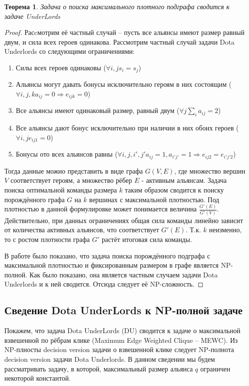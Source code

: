 \documentclass{article}
\newtheorem{theorem}{Теорема}
\begin{document}
\begin{theorem}
\label{MEWC_DU}
Задача о поиска максимального плотного подграфа сводится к задаче UnderLords
\end{theorem}
\begin{proof}
Расcмотрим её частный случай -- пусть все альянсы имеют размер равный двум, и сила всех героев одинакова. Рассмотрим частный случай задачи Dota Underlords со следующими ограничениями:

\begin{enumerate}
    \item Силы всех героев одинаковы ($\forall i, j s_i=s_j$)
    \item Альянсы могут давать бонусы исключительно героям в них состоящим ($\forall i, j, k a_{ij}=0 \Longrightarrow e_{ijk} = 0$)
    \item Все альянсы имеют одинаковый размер, равный двум ($\forall j \sum_i a_{ij}=2$)
    \item Все альянсы дают бонус исключительно при наличии в них обоих героев ($\forall i, j e_{ij1}=0$)
    \item Бонусы ото всех альянсов равны ($\forall i, j, i', j' a_{ij}=1, a_{i' j'}=1 \Longrightarrow e_{ij2}=e_{i' j' 2}$)
\end{enumerate}

Тогда данные можно представить в виде графа $G(V, E)$, где множество вершин $V$ соответствует героям, а множество рёбер $E$ - активным альянсам. Задача поиска оптимальной команды размера $k$ таким образом сводится к поиску порождённого графа $G$ на $k$ вершинах с максимальной плотностью. Под плотностью в данной формулировке может понимается величина $\frac{G'(E)}{G'(V)}$. Действительно, при данных ограничениях общая сила команды линейно зависит от количества активных альянсов, что соответствует $G'(E)$. Т.к. $k$ неизменно, то с ростом плотности графа $G'$ растёт итоговая сила команды.

В работе \cite{downey1995fixed} было показано, что задача поиска порождённого подграфа с максимальной плотностью и фиксированным размером в графе является NP-полной. Как было показано, она является частным случаем задачи Dota Underlords и к ней сводится. Отсюда следует её NP-сложность.

\end{proof}

\subsection{Сведение Dota UnderLords к NP-полной задаче}
Покажем, что задача Dota UnderLords (DU) сводится к задаче о максимальной взвешенной по рёбрам клике (Maximum Edge Weighted Clique – MEWC).
Из NP-плносты decision version задачи о взвешенной клике следует NP-полнота decision version задачи Dota Underlords. В данном сведении мы будем рассматривать задачу, в которой, максимальный размер альянса $q$ ограничен некоторой константой.
\end{document}
